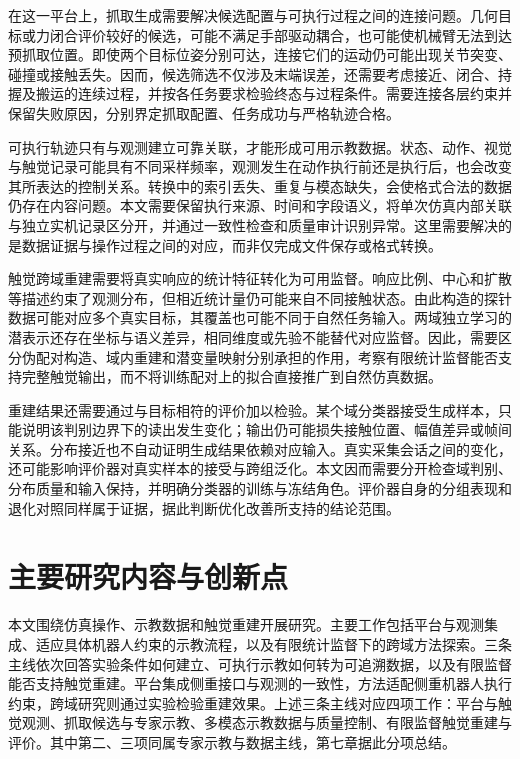 在这一平台上，抓取生成需要解决候选配置与可执行过程之间的连接问题。几何目标或力闭合评价较好的候选，可能不满足手部驱动耦合，也可能使机械臂无法到达预抓取位置。即使两个目标位姿分别可达，连接它们的运动仍可能出现关节突变、碰撞或接触丢失。因而，候选筛选不仅涉及末端误差，还需要考虑接近、闭合、持握及搬运的连续过程，并按各任务要求检验终态与过程条件。需要连接各层约束并保留失败原因，分别界定抓取配置、任务成功与严格轨迹合格。

可执行轨迹只有与观测建立可靠关联，才能形成可用示教数据。状态、动作、视觉与触觉记录可能具有不同采样频率，观测发生在动作执行前还是执行后，也会改变其所表达的控制关系。转换中的索引丢失、重复与模态缺失，会使格式合法的数据仍存在内容问题。本文需要保留执行来源、时间和字段语义，将单次仿真内部关联与独立实机记录区分开，并通过一致性检查和质量审计识别异常。这里需要解决的是数据证据与操作过程之间的对应，而非仅完成文件保存或格式转换。

触觉跨域重建需要将真实响应的统计特征转化为可用监督。响应比例、中心和扩散等描述约束了观测分布，但相近统计量仍可能来自不同接触状态。由此构造的探针数据可能对应多个真实目标，其覆盖也可能不同于自然任务输入。两域独立学习的潜表示还存在坐标与语义差异，相同维度或先验不能替代对应监督。因此，需要区分伪配对构造、域内重建和潜变量映射分别承担的作用，考察有限统计监督能否支持完整触觉输出，而不将训练配对上的拟合直接推广到自然仿真数据。

重建结果还需要通过与目标相符的评价加以检验。某个域分类器接受生成样本，只能说明该判别边界下的读出发生变化；输出仍可能损失接触位置、幅值差异或帧间关系。分布接近也不自动证明生成结果依赖对应输入。真实采集会话之间的变化，还可能影响评价器对真实样本的接受与跨组泛化。本文因而需要分开检查域判别、分布质量和输入保持，并明确分类器的训练与冻结角色。评价器自身的分组表现和退化对照同样属于证据，据此判断优化改善所支持的结论范围。

\section{主要研究内容与创新点}
\label{sec:research_contents}

本文围绕仿真操作、示教数据和触觉重建开展研究。主要工作包括平台与观测集成、适应具体机器人约束的示教流程，以及有限统计监督下的跨域方法探索。三条主线依次回答实验条件如何建立、可执行示教如何转为可追溯数据，以及有限监督能否支持触觉重建。平台集成侧重接口与观测的一致性，方法适配侧重机器人执行约束，跨域研究则通过实验检验重建效果。上述三条主线对应四项工作：平台与触觉观测、抓取候选与专家示教、多模态示教数据与质量控制、有限监督触觉重建与评价。其中第二、三项同属专家示教与数据主线，第七章据此分项总结。

